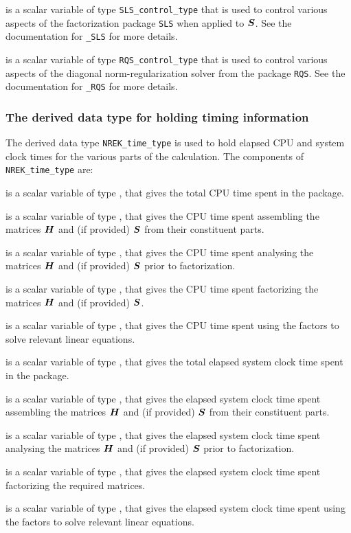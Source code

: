 \documentclass{galahad}
\newcommand{\packagename}{NREK}
\begin{document}
\begin{description}
 is a scalar variable of type
{\tt SLS\_control\_type} that is used to control various aspects of the
factorization package {\tt SLS} when applied to ${\bm{S}}$. See the documentation 
for {\tt \libraryname\_SLS} for more details.

 is a scalar variable of type
{\tt RQS\_control\_type} that is used to control various aspects of the
diagonal norm-regularization solver from the package {\tt RQS}. See the 
documentation for {\tt \libraryname\_RQS} for more details.

\end{description}


\subsubsection{The derived data type for holding timing
 information}\label{typetime}
The derived data type
{\tt \packagename\_time\_type}
is used to hold elapsed CPU and system clock times for the various parts of
the calculation. The components of
{\tt \packagename\_time\_type}
are:
\begin{description}
 is a scalar variable of type \realdp, that gives
 the total CPU time spent in the package.

 is a scalar variable of type \realdp, that gives
 the CPU time spent assembling the matrices ${\bm{H}}$ and (if provided) ${\bm{S}}$
 from their constituent parts.

 is a scalar variable of type \realdp, that gives
 the CPU time spent analysing the matrices ${\bm{H}}$ and (if provided) ${\bm{S}}$
 prior to factorization.

 is a scalar variable of type \realdp, that gives
 the CPU time spent factorizing the matrices ${\bm{H}}$ and (if provided) ${\bm{S}}$.

 is a scalar variable of type \realdp, that gives
 the CPU time spent using the factors to solve relevant linear equations.

 is a scalar variable of type \realdp, that gives
 the total elapsed system clock time spent in the package.

 is a scalar variable of type \realdp, that gives
 the elapsed system clock time spent assembling the 
 matrices ${\bm{H}}$ and (if provided) ${\bm{S}}$ from their constituent parts.

 is a scalar variable of type \realdp, that gives
 the elapsed system clock time spent analysing the matrices ${\bm{H}}$ and
  (if provided) ${\bm{S}}$ prior to factorization.

 is a scalar variable of type \realdp, that gives
 the elapsed system clock time spent factorizing the required matrices.

 is a scalar variable of type \realdp, that gives
 the elapsed system clock time spent using the factors to solve relevant
linear equations.

\end{description}
\end{document}
